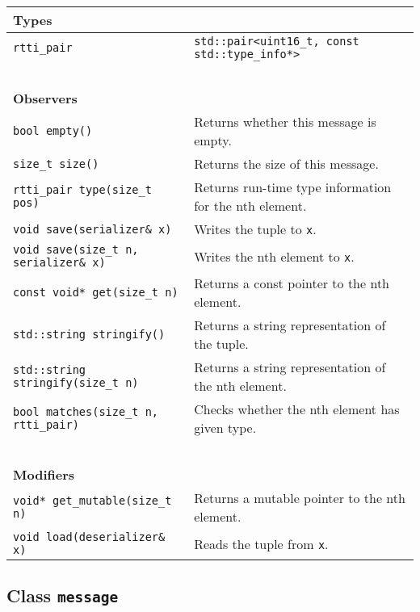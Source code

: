 {\small
\begin{tabular}{ll}
  \textbf{Types} & ~ \\
  \hline
  \lstinline^rtti_pair^ & \lstinline^std::pair<uint16_t, const std::type_info*>^ \\
  \hline
  ~ & ~ \\ \textbf{Observers} & ~ \\
  \hline
  \lstinline^bool empty()^ & Returns whether this message is empty. \\
  \hline
  \lstinline^size_t size()^ & Returns the size of this message. \\
  \hline
  \lstinline^rtti_pair type(size_t pos)^ & Returns run-time type information for the nth element. \\
  \hline
  \lstinline^void save(serializer& x)^ & Writes the tuple to \lstinline^x^. \\
  \hline
  \lstinline^void save(size_t n, serializer& x)^ & Writes the nth element to \lstinline^x^. \\
  \hline
  \lstinline^const void* get(size_t n)^ & Returns a const pointer to the nth element. \\
  \hline
  \lstinline^std::string stringify()^ & Returns a string representation of the tuple. \\
  \hline
  \lstinline^std::string stringify(size_t n)^ & Returns a string representation of the nth element. \\
  \hline
  \lstinline^bool matches(size_t n, rtti_pair)^ & Checks whether the nth element has given type. \\
  \hline
  ~ & ~ \\ \textbf{Modifiers} & ~ \\
  \hline
  \lstinline^void* get_mutable(size_t n)^ & Returns a mutable pointer to the nth element. \\
  \hline
  \lstinline^void load(deserializer& x)^ & Reads the tuple from \lstinline^x^. \\
  \hline
\end{tabular}
}

\subsection{Class \texttt{message}}

